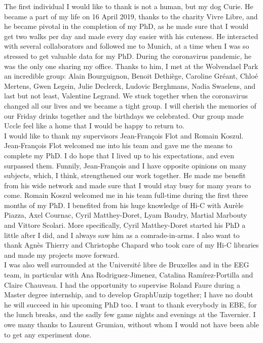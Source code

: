 
The first individual I would like to thank is not a human, but my dog Curie. He became a part of my life on 16 April 2019, thanks to the charity Vivre Libre, and he became pivotal in the completion of my PhD, as he made sure that I would get two walks per day and made every day easier with his cuteness. He interacted with several collaborators and followed me to Munich, at a time when I was so stressed to get valuable data for my PhD. During the coronavirus pandemic, he was the only one sharing my office. Thanks to him, I met at the Wolvendael Park an incredible group: Alain Bourguignon, Benoit Dethiège, Caroline Gréant, Chloé Mertens, Gwen Legein, Julie Declerck, Ludovic Berghmans, Nadia Swaelens, and last but not least, Valentine Legrand. We stuck together when the coronavirus changed all our lives and we became a tight group. I will cherish the memories of our Friday drinks together and the birthdays we celebrated. Our group made Uccle feel like a home that I would be happy to return to.\\

I would like to thank my supervisors Jean-François Flot and Romain Koszul. Jean-François Flot welcomed me into his team and gave me the means to complete my PhD. I do hope that I lived up to his expectations, and even surpassed them. Funnily, Jean-François and I have opposite opinions on many subjects, which, I think, strengthened our work together. He made me benefit from his wide network and made sure that I would stay busy for many years to come. Romain Koszul welcomed me in his team full-time during the first three months of my PhD. I benefited from his huge knowledge of Hi-C with Aurèle Piazza, Axel Cournac, Cyril Matthey-Doret, Lyam Baudry, Martial Marbouty and Vittore Scolari. More specifically, Cyril Matthey-Doret started his PhD a little after I did, and I always saw him as a comrade-in-arms. I also want to thank Agnès Thierry and Christophe Chapard who took care of my Hi-C libraries and made my projects move forward. \\

I was also well surrounded at the Université libre de Bruxelles and in the EEG team, in particular with Ana Rodriguez-Jimenez, Catalina Ramírez-Portilla and Claire Chauveau. I had the opportunity to supervise Roland Faure during a Master degree internship, and to develop GraphUnzip together; I have no doubt he will succeed in his upcoming PhD too. I want to thank everybody in EBE, for the lunch breaks, and the sadly few game nights and evenings at the Tavernier. I owe many thanks to Laurent Grumiau, without whom I would not have been able to get any experiment done. \\


